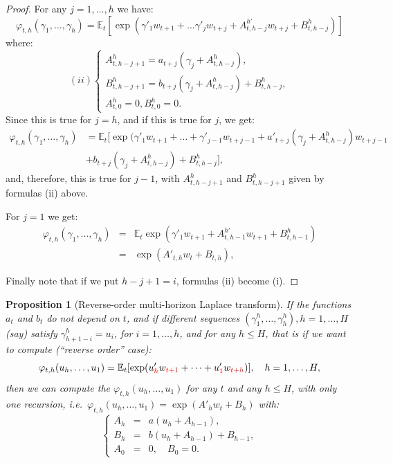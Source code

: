 \documentclass[
  12pt,
]{book}
\newtheorem{proposition}{Proposition}[chapter]
\theoremstyle{definition}
\theoremstyle{definition}
\theoremstyle{definition}
\theoremstyle{definition}
\theoremstyle{remark}
\begin{document}
\begin{proof}
For any \(j=1,\dots,h\) we have:
\[
\varphi_{t,h}(\gamma_1,\dots,\gamma_h) = \mathbb{E}_t[\exp(\gamma'_1 w_{t+1}+\dots\gamma'_j w_{t+j}+A^{h'}_{t,h-j}w_{t+j}+B^h_{t,h-j})]
\]
where:
\[
(ii) \left\{
\begin{array}{l}
A^h_{t,h-j+1} = a_{t+j}(\gamma_{j} + A^h_{t,h-j}), \\
B^h_{t,h-j+1} = b_{t+j}(\gamma_{j} + A^h_{t,h-j}) + B^h_{t,h-j}, \\
A^h_{t,0} = 0, B^h_{t,0} = 0.
\end{array}
\right.
\]
Since this is true for \(j=h\), and if this is true for \(j\), we get:
\[
\begin{array}{ll}
\varphi_{t,h}(\gamma_1,\dots,\gamma_h) & = \mathbb{E}_t [\exp(\gamma'_1 w_{t+1}+\dots+\gamma'_{j-1}w_{t+j-1}+a'_{t+j}(\gamma_j+A^h_{t,h-j})w_{t+j-1} \\
& + b_{t+j}(\gamma_j+A^h_{t,h-j})+B^h_{t,h-j}],
\end{array}
\]
and, therefore, this is true for \(j-1\), with \(A^h_{t,h-j+1}\) and \(B^h_{t,h-j+1}\) given by formulas (ii) above.

For \(j=1\) we get:
\begin{eqnarray*}
\varphi_{t,h}(\gamma_1,\dots,\gamma_h) &=& \mathbb{E}_t \exp(\gamma'_1 w_{t+1}+A^{h'}_{t,h-1}w_{t+1}+B^h_{t,h-1}) \\
&=& \exp(A'_{t,h} w_t+B_{t,h}),
\end{eqnarray*}

Finally note that if we put \(h-j+1 = i\), formulas (ii) become (i).
\end{proof}

\begin{proposition}[Reverse-order multi-horizon Laplace transform]
\protect\hypertarget{prp:reverseMLT}{}\label{prp:reverseMLT}If the functions \(a_{t}\) and \(b_{t}\) do not depend on \(t\), and if different sequences \((\gamma^h_1,\dots,\gamma^h_h), h=1,\dots,H\) (say) satisfy \(\gamma^h_{h+1-i} = u_i\), for
\(i=1,\dots,h\), and for any \(h \leq H\), that is if we want to compute (``reverse order'' case):
\[
\varphi_{t,h}(u_h,\dots,u_1)=\mathbb{E}_t[\exp(u'_{{\color{red}h}} w_{{\color{red}t+1}}+\dots+u'_{{\color{red}1}} w_{{\color{red}t+h}})],
\quad h=1,\dots,H,
\]
then we can compute the \(\varphi_{t,h}(u_h,\dots,u_1)\) for any \(t\) and any \(h \leq H\), with only one recursion, i.e.~\(\varphi_{t,h}(u_h,\dots,u_1)=\exp(A'_hw_t+B_h)\) with:
\begin{equation}
\left\{
\begin{array}{ccl}
A_{h} &=& a(u_{h} + A_{h-1}), \\
B_{h} &=& b(u_{h} + A_{h-1}) + B_{h-1}, \\
A_{0} &=& 0,\quad  B_{0} = 0.
\end{array}
\right.\label{eq:auxLemmareverseMLT}
\end{equation}
\end{proposition}
\end{document}
